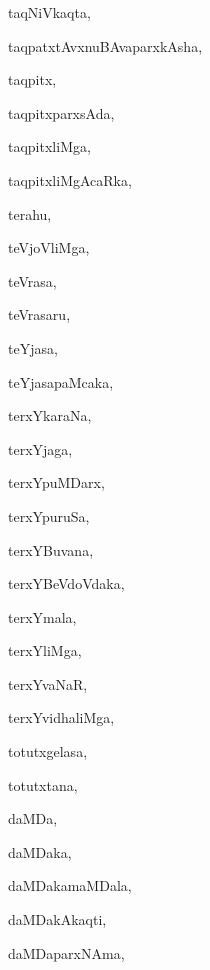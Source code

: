 \begin{multicols}{3}
{\noindent
{taqNiVkaqta}, \pageref{taqNiVkaqta}

\noindent
{taqpatxtAvxnuBAvaparxkAsha}, \pageref{taqpatxtAvxnuBAvaparxkAsha}

\noindent
{taqpitx}, \pageref{taqpitx}

\noindent
{taqpitxparxsAda}, \pageref{taqpitxparxsAda}

\noindent
{taqpitxliMga}, \pageref{taqpitxliMga}

\noindent
{taqpitxliMgAcaRka}, \pageref{taqpitxliMgAcaRka}

\noindent
{terahu}, \pageref{terahu}

\noindent
{teVjoVliMga}, \pageref{teVjoVliMga}

\noindent
{teVrasa}, \pageref{teVrasa}

\noindent
{teVrasaru}, \pageref{teVrasaru}

\noindent
{teYjasa}, \pageref{teYjasa}

\noindent
{teYjasapaMcaka}, \pageref{teYjasapaMcaka}

\noindent
{terxYkaraNa}, \pageref{terxYkaraNa}

\noindent
{terxYjaga}, \pageref{terxYjaga}

\noindent
{terxYpuMDarx}, \pageref{terxYpuMDarx}

\noindent
{terxYpuruSa}, \pageref{terxYpuruSa}

\noindent
{terxYBuvana}, \pageref{terxYBuvana}

\noindent
{terxYBeVdoVdaka}, \pageref{terxYBeVdoVdaka}

\noindent
{terxYmala}, \pageref{terxYmala}

\noindent
{terxYliMga}, \pageref{terxYliMga2}

\noindent
{terxYvaNaR}, \pageref{terxYvaNaR}

\noindent
{terxYvidhaliMga}, \pageref{terxYvidhaliMga}

\noindent
{totutxgelasa}, \pageref{totutxgelasa}

\noindent
{totutxtana}, \pageref{totutxtana}

\bigskip
\noindent
{}
\smallskip

\noindent
{daMDa}, \pageref{daMDa}

\noindent
{daMDaka}, \pageref{daMDaka}

\noindent
{daMDakamaMDala}, \pageref{daMDakamaMDala}

\noindent
{daMDakAkaqti}, \pageref{daMDakAkaqti}

\noindent
{daMDaparxNAma}, \pageref{daMDaparxNAma}

}
\end{multicols}

